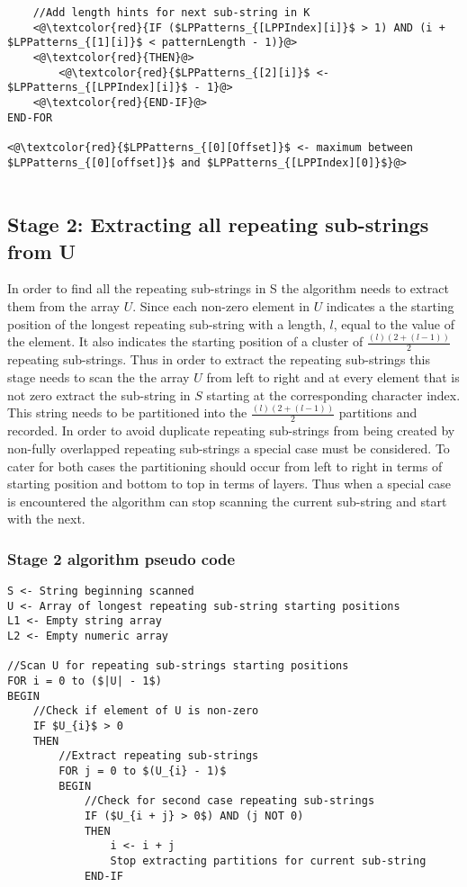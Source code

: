 \documentclass[12pt]{article}
\begin{document}
\begin{flushleft}
\begin{lstlisting}
	//Add length hints for next sub-string in K
	<@\textcolor{red}{IF ($LPPatterns_{[LPPIndex][i]}$ > 1) AND (i + $LPPatterns_{[1][i]}$ < patternLength - 1)}@>
	<@\textcolor{red}{THEN}@>
		<@\textcolor{red}{$LPPatterns_{[2][i]}$ <- $LPPatterns_{[LPPIndex][i]}$ - 1}@>
	<@\textcolor{red}{END-IF}@>
END-FOR

<@\textcolor{red}{$LPPatterns_{[0][Offset]}$ <- maximum between $LPPatterns_{[0][offset]}$ and $LPPatterns_{[LPPIndex][0]}$}@>


\end{lstlisting}
	\newpage	
	\subsection{Stage 2: Extracting all repeating sub-strings from U}
		
	In order to find all the repeating sub-strings in S the algorithm needs to extract them from the array $U$. Since each non-zero element in $U$ indicates a the starting position of the longest repeating sub-string with a length, $l$, equal to the value of the element. It also indicates the starting position of a cluster of $\frac{(l)(2 + (l-1))}{2}$ repeating sub-strings. Thus in order to extract the repeating sub-strings this stage needs to scan the the array $U$ from left to right and at every element that is not zero extract the sub-string in $S$ starting at the corresponding character index. This string needs to be partitioned into the $\frac{(l)(2 + (l-1))}{2}$ partitions and recorded. In order to avoid duplicate repeating sub-strings from being created by non-fully overlapped repeating sub-strings a special case must be considered. To cater for both cases the partitioning should occur from left to right in terms of starting position and bottom to top in terms of layers. Thus when a special case is encountered the algorithm can stop scanning the current sub-string and start with the next.
	\newpage
	\subsubsection{Stage 2 algorithm pseudo code}

\begin{lstlisting}
S <- String beginning scanned
U <- Array of longest repeating sub-string starting positions
L1 <- Empty string array
L2 <- Empty numeric array

//Scan U for repeating sub-strings starting positions 
FOR i = 0 to ($|U| - 1$)  
BEGIN			                
	//Check if element of U is non-zero
	IF $U_{i}$ > 0 
	THEN
		//Extract repeating sub-strings
		FOR j = 0 to $(U_{i} - 1)$ 
		BEGIN                  
			//Check for second case repeating sub-strings
			IF ($U_{i + j} > 0$) AND (j NOT 0) 
			THEN
				i <- i + j
				Stop extracting partitions for current sub-string
			END-IF
			

\end{lstlisting}
\end{flushleft}
\end{document}

